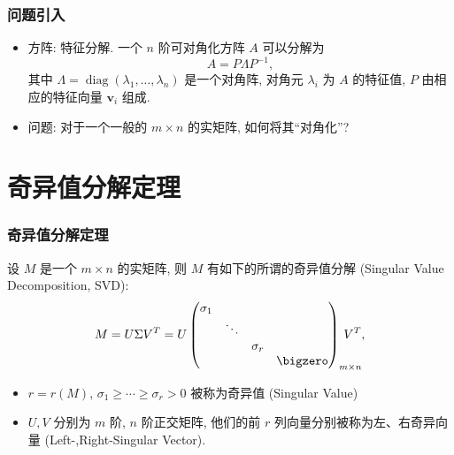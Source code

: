 \begin{frame}
\frametitle{问题引入}

\begin{itemize}
\item<1-> 方阵: 特征分解. \newline
一个 $n$ 阶可对角化方阵 $A$ 可以分解为
\[A = P\Lambda P^{-1},\]
其中 $\Lambda = \operatorname{diag}(\lambda_1,\ldots,\lambda_n)$ 是一个{\color{red}对角阵}, 对角元 $\lambda_i$ 为 $A$ 的特征值, $P$ 由相应的特征向量 $\mathbf{v}_i$ 组成. \newline

\item<2-> 问题: 对于一个一般的 $m\times n$ 的实矩阵, 如何将其``对角化''?
\end{itemize}

\end{frame}


\section{奇异值分解定理}


\begin{frame}
\frametitle{奇异值分解定理}

\begin{thm}
设 $M$ 是一个 $m\times n$ 的实矩阵, 则 $M$ 有如下的所谓的奇异值分解 (Singular Value Decomposition, SVD):
\[M = U\Sigma V^T = U\begin{pmatrix}
\sigma_1 & & & \\ & \ddots & & \\ & & \sigma_r & \\ & & & \bigzero \end{pmatrix}_{m\times n}\!\!\!\!\!\!\!\!\!\! V^T,\]
\pause
\begin{itemize}
\item $r = r(M)$, $\sigma_1 \geqslant \cdots \geqslant \sigma_r > 0$ 被称为奇异值 (Singular Value)
\item $U,V$ 分别为 $m$ 阶, $n$ 阶正交矩阵, 他们的前 $r$ 列向量分别被称为左、右奇异向量 (Left-,Right-Singular Vector).
\end{itemize}
\end{thm}

\end{frame}

